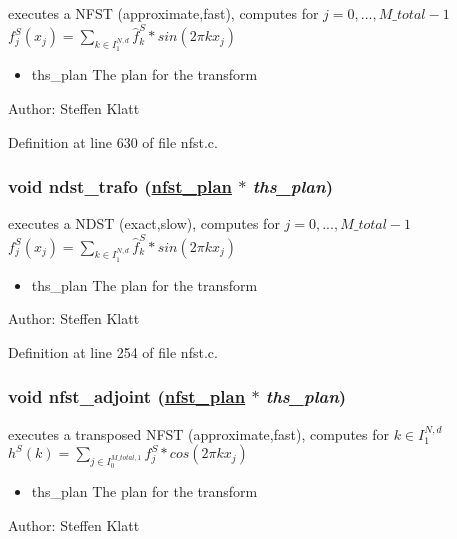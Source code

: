 executes a NFST (approximate,fast), computes for $j=0,...,M\_total-1$ $f_j^S(x_j) = \sum_{k \in I_1^{N,d}} \hat{f}_k^S * sin(2 \pi k x_j)$ 

\begin{itemize}
\item ths\_\-plan The plan for the transform\end{itemize}
\begin{Desc}
\item[Author:]Steffen Klatt \end{Desc}


Definition at line 630 of file nfst.c.\hypertarget{group__nfsct_ga23}{
\subsubsection[ndst\_\-trafo]{\setlength{\rightskip}{0pt plus 5cm}void ndst\_\-trafo (\hyperlink{structnfst__plan}{nfst\_\-plan} $\ast$ {\em ths\_\-plan})}}
\label{group__nfsct_ga23}


executes a NDST (exact,slow), computes for $j=0,...,M\_total-1$ $f_j^S(x_j) = \sum_{k \in I_1^{N,d}} \hat{f}_k^S * sin(2 \pi k x_j)$ 

\begin{itemize}
\item ths\_\-plan The plan for the transform\end{itemize}
\begin{Desc}
\item[Author:]Steffen Klatt \end{Desc}


Definition at line 254 of file nfst.c.\hypertarget{group__nfsct_ga24}{
\subsubsection[nfst\_\-adjoint]{\setlength{\rightskip}{0pt plus 5cm}void nfst\_\-adjoint (\hyperlink{structnfst__plan}{nfst\_\-plan} $\ast$ {\em ths\_\-plan})}}
\label{group__nfsct_ga24}


executes a transposed NFST (approximate,fast), computes for $k \in I_1^{N,d}$ $h^S(k) = \sum_{j \in I_0^{M\_total,1}} f_j^S * cos(2 \pi k x_j)$ 

\begin{itemize}
\item ths\_\-plan The plan for the transform\end{itemize}
\begin{Desc}
\item[Author:]Steffen Klatt \end{Desc}


